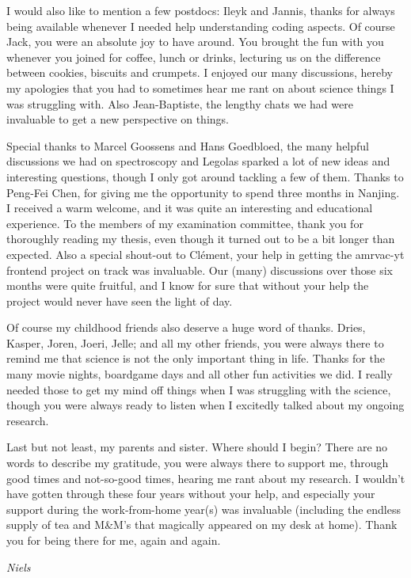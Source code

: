 I would also like to mention a few postdocs: Ileyk and Jannis, thanks for always being available whenever I needed help understanding coding aspects. Of course Jack, you were an absolute joy to have around. You brought the fun with you whenever you joined for coffee, lunch or drinks, lecturing us on the difference between cookies, biscuits and crumpets.
I enjoyed our many discussions, hereby my apologies that you had to sometimes hear me rant on about science things I was struggling with. Also Jean-Baptiste, the lengthy chats we had were invaluable to get a new perspective on things.

Special thanks to Marcel Goossens and Hans Goedbloed, the many helpful discussions we had on spectroscopy and Legolas sparked a lot of new ideas and interesting questions, though I only got around tackling a few of them. Thanks to Peng-Fei Chen, for giving me the opportunity to spend three months in Nanjing. I received a warm welcome, and it was quite an interesting and educational experience. To the members of my examination committee, thank you for thoroughly reading my thesis, even though it turned out to be a bit longer than expected. Also a special shout-out to Clément, your help in getting the amrvac-yt frontend project on track was invaluable. Our (many) discussions over those six months were quite fruitful, and I know for sure that without your help the project would never have seen the light of day.

Of course my childhood friends also deserve a huge word of thanks. Dries, Kasper, Joren, Joeri, Jelle; and all my other friends, you were always there to remind me that science is not the only important thing in life. Thanks for the many movie nights, boardgame days and all other fun activities we did. I really needed those to get my mind off things when I was struggling with the science, though you were always ready to listen when I excitedly talked about my ongoing research.

Last but not least, my parents and sister. Where should I begin? There are no words to describe my gratitude, you were always there to support me, through good times and not-so-good times, hearing me rant about my research. I wouldn't have gotten through these four years without your help, and especially your support during the work-from-home year(s) was invaluable (including the endless supply of tea and M\&M's that magically appeared on my desk at home). Thank you for being there for me, again and again.
\begin{flushright}
  \emph{Niels}
\end{flushright}



\cleardoublepage
